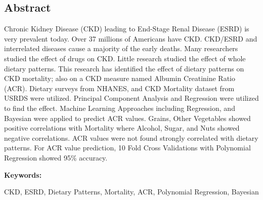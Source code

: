 \begin{center} \section*{Abstract} \end{center}
Chronic Kidney Disease (CKD) leading to End-Stage Renal Disease (ESRD) is very prevalent today. Over 37 millions of Americans have CKD. CKD/ESRD and interrelated diseases cause a majority of the early deaths.  Many researchers studied the effect of drugs on CKD. Little research studied the effect of  whole dietary patterns. This research has identified the effect of dietary patterns on CKD mortality; also on a CKD measure named Albumin Creatinine Ratio (ACR). Dietary surveys from NHANES, and CKD Mortality dataset from USRDS were utilized. Principal Component Analysis and Regression were utilized to find the effect. Machine Learning Approaches including Regression, and Bayesian were applied to predict ACR values. Grains, Other Vegetables showed positive correlations with Mortality where Alcohol, Sugar, and Nuts showed negative correlations. ACR values were not found strongly correlated with dietary patterns. For ACR value prediction, 10 Fold Cross Validations with Polynomial Regression showed 95\% accuracy.

\medskip
\noindent \textbf{Keywords:} 

\noindent CKD, ESRD, Dietary Patterns, Mortality, ACR, Polynomial Regression, Bayesian